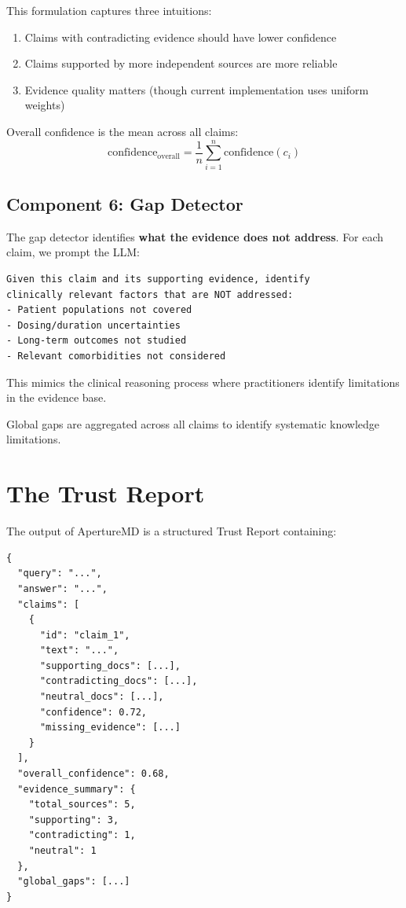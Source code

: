\documentclass[11pt,a4paper]{article}
\begin{document}
This formulation captures three intuitions:
\begin{enumerate}
    \item Claims with contradicting evidence should have lower confidence
    \item Claims supported by more independent sources are more reliable
    \item Evidence quality matters (though current implementation uses uniform weights)
\end{enumerate}

Overall confidence is the mean across all claims:
\begin{equation}
    \text{confidence}_{\text{overall}} = \frac{1}{n} \sum_{i=1}^{n} \text{confidence}(c_i)
\end{equation}

\subsection{Component 6: Gap Detector}

The gap detector identifies \textbf{what the evidence does not address}. For each claim, we prompt the LLM:

\begin{lstlisting}
Given this claim and its supporting evidence, identify 
clinically relevant factors that are NOT addressed:
- Patient populations not covered
- Dosing/duration uncertainties  
- Long-term outcomes not studied
- Relevant comorbidities not considered
\end{lstlisting}

This mimics the clinical reasoning process where practitioners identify limitations in the evidence base.

Global gaps are aggregated across all claims to identify systematic knowledge limitations.

\section{The Trust Report}

The output of ApertureMD is a structured Trust Report containing:

\begin{lstlisting}
{
  "query": "...",
  "answer": "...",
  "claims": [
    {
      "id": "claim_1",
      "text": "...",
      "supporting_docs": [...],
      "contradicting_docs": [...],
      "neutral_docs": [...],
      "confidence": 0.72,
      "missing_evidence": [...]
    }
  ],
  "overall_confidence": 0.68,
  "evidence_summary": {
    "total_sources": 5,
    "supporting": 3,
    "contradicting": 1,
    "neutral": 1
  },
  "global_gaps": [...]
}
\end{lstlisting}
\end{document}
